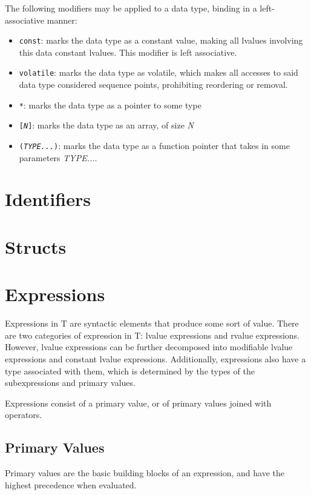 \documentclass[letterpaper,12pt]{book}
\begin{document}
The following modifiers may be applied to a data type, binding in a left-associative manner:

\begin{itemize}
	\item \texttt{const}: marks the data type as a constant value, making all lvalues involving this data constant lvalues. This modifier is left associative.
	\item \texttt{volatile}: marks the data type as volatile, which makes all accesses to said data type considered sequence points, prohibiting reordering or removal.
	\item \texttt{*}: marks the data type as a pointer to some type
	\item \texttt{[\textit{N}]}: marks the data type as an array, of size \textit{N}
	\item \texttt{(\textit{TYPE...})}: marks the data type as a function pointer that takes in some parameters \textit{TYPE...}.
\end{itemize}

\section{Identifiers}

\section{Structs}

\section{Expressions}

Expressions in T are syntactic elements that produce some sort of value. There are two categories of expression in T: lvalue expressions and rvalue expressions. However, lvalue expressions can be further decomposed into modifiable lvalue expressions and constant lvalue expressions. Additionally, expressions also have a type associated with them, which is determined by the types of the subexpressions and primary values.

Expressions consist of a primary value, or of primary values joined with operators.

\subsection{Primary Values}

Primary values are the basic building blocks of an expression, and have the highest precedence when evaluated.
\end{document}
